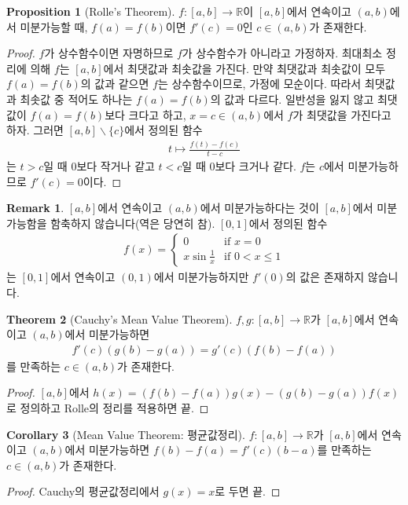 \documentclass[12pt]{article}
\theoremstyle{definition}
\newtheorem{thm}{Theorem}[section]
\newtheorem{cor}[thm]{Corollary}
\newtheorem{prop}[thm]{Proposition}
\newtheorem*{rem}{Remark}
\def\RR{\mathbb{R}}
\begin{document}
\begin{prop} [Rolle's Theorem]
	\(f: [a, b] \rightarrow \RR\)이 \([a, b]\)에서 연속이고 \((a, b)\)에서 미분가능할 때, \(f(a) = f(b)\)이면 \(f'(c) = 0\)인 \(c \in (a, b)\)가 존재한다.
\end{prop}
\begin{proof}
	\(f\)가 상수함수이면 자명하므로 \(f\)가 상수함수가 아니라고 가정하자. 최대최소 정리에 의해 \(f\)는 \([a, b]\)에서 최댓값과 최솟값을 가진다. 만약 최댓값과 최솟값이 모두 \(f(a) = f(b)\)의 값과 같으면 \(f\)는 상수함수이므로, 가정에 모순이다. 따라서 최댓값과 최솟값 중 적어도 하나는 \(f(a) = f(b)\)의 값과 다르다. 일반성을 잃지 않고 최댓값이 \(f(a) = f(b)\)보다 크다고 하고, \(x = c \in (a, b)\)에서 \(f\)가 최댓값을 가진다고 하자. 그러면 \([a, b] \backslash \{c\}\)에서 정의된 함수
	\begin{gather*}
		t \mapsto \frac{f(t) - f(c)}{t - c}
	\end{gather*}
	는 \(t > c\)일 때 0보다 작거나 같고 \(t < c\)일 때 0보다 크거나 같다. \(f\)는 \(c\)에서 미분가능하므로 \(f'(c) = 0\)이다.
\end{proof}

\begin{rem}
	\([a, b]\)에서 연속이고 \((a, b)\)에서 미분가능하다는 것이 \([a, b]\)에서 미분가능함을 함축하지 않습니다(역은 당연히 참). \([0, 1]\)에서 정의된 함수
	\begin{gather*}
		f(x)=
		\begin{cases}
			0 &\text{if } x = 0\\
			x\sin\frac{1}{x} &\text{if } 0 < x \le 1
		\end{cases}
	\end{gather*}
	는 \([0, 1]\)에서 연속이고 \((0, 1)\)에서 미분가능하지만 \(f'(0)\)의 값은 존재하지 않습니다.
\end{rem}

\begin{thm} [Cauchy's Mean Value Theorem]
	\(f, g: [a, b] \rightarrow \RR\)가 \([a, b]\)에서 연속이고 \((a, b)\)에서 미분가능하면
	\begin{gather*}
		f'(c)(g(b) - g(a)) = g'(c)(f(b) - f(a))
	\end{gather*}
	를 만족하는 \(c \in (a, b)\)가 존재한다.
\end{thm}
\begin{proof}
	\([a, b]\)에서 \(h(x) = (f(b) - f(a))g(x) - (g(b) - g(a))f(x)\)로 정의하고 Rolle의 정리를 적용하면 끝.
\end{proof}

\begin{cor} [Mean Value Theorem: 평균값정리]
	\(f: [a, b] \rightarrow \RR\)가 \([a, b]\)에서 연속이고 \((a, b)\)에서 미분가능하면 \(f(b) - f(a) = f'(c)(b - a)\)를 만족하는 \(c \in (a, b)\)가 존재한다.
\end{cor}
\begin{proof}
	Cauchy의 평균값정리에서 \(g(x) = x\)로 두면 끝.
\end{proof}
\end{document}
